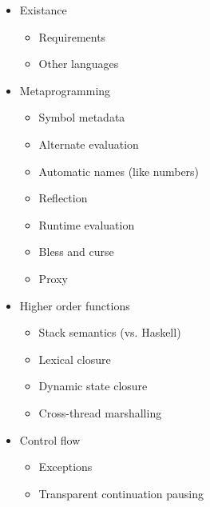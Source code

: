 \begin{itemize}
\item Existance

  \begin{itemize}

  \item Requirements

  \item Other languages

  \end{itemize}

\item Metaprogramming

  \begin{itemize}

  \item Symbol metadata

  \item Alternate evaluation

  \item Automatic names (like numbers)

  \item Reflection

  \item Runtime evaluation

  \item Bless and curse

  \item Proxy

  \end{itemize}

\item Higher order functions

  \begin{itemize}

  \item Stack semantics (vs. Haskell)

  \item Lexical closure

  \item Dynamic state closure

  \item Cross-thread marshalling

  \end{itemize}

\item Control flow

  \begin{itemize}

  \item Exceptions

  \item Transparent continuation pausing


\end{itemize}
\end{itemize}
